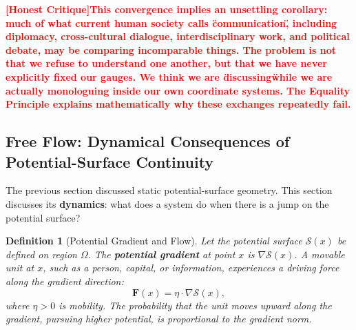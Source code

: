 \documentclass[12pt,a4paper]{article}
\newtheorem{definition}[theorem]{Definition}
\theoremstyle{remark}
\newcommand{\honestcrit}[1]{%
    \textcolor{red}{\textbf{[Honest Critique]#1}}%
}
\begin{document}
\begin{center}
\end{center}

\honestcrit{This convergence implies an unsettling corollary: much of what current human society calls \"communication\", including diplomacy, cross-cultural dialogue, interdisciplinary work, and political debate, may be comparing incomparable things. The problem is not that we refuse to understand one another, but that we have never explicitly fixed our gauges. We think we are \"discussing\" while we are actually monologuing inside our own coordinate systems. The Equality Principle explains mathematically why these exchanges repeatedly fail.}

\subsection{Free Flow: Dynamical Consequences of Potential-Surface Continuity}

The previous section discussed static potential-surface geometry. This section discusses its \textbf{dynamics}: what does a system do when there is a jump on the potential surface?

\begin{definition}[Potential Gradient and Flow]\label{def:gradient_flow}
Let the potential surface $\mathcal{S}(x)$ be defined on region $\Omega$. The \textbf{potential gradient} at point $x$ is $\nabla \mathcal{S}(x)$. A movable unit at $x$, such as a person, capital, or information, experiences a driving force along the gradient direction:
\begin{equation}
    \mathbf{F}(x) = \eta \cdot \nabla \mathcal{S}(x),
\end{equation}
where $\eta > 0$ is mobility. The probability that the unit moves upward along the gradient, pursuing higher potential, is proportional to the gradient norm.
\end{definition}
\end{document}
